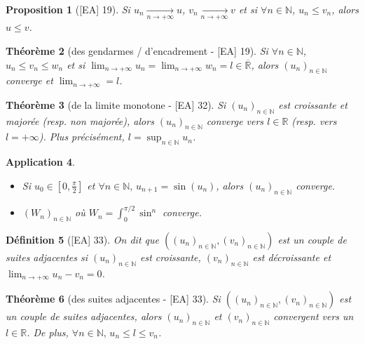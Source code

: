 \documentclass[10pt, a4paper, parskip=full, twoside, twocolumn]{report}
\newtheorem{definition}{Définition}
\newtheorem{theorem}[definition]{Théorème}
\newtheorem{proposition}[definition]{Proposition}
\newtheorem{application}[definition]{Application}
\newcommand{\IN}{\mathbb{N}}
\newcommand{\IR}{\mathbb{R}}
\begin{document}
\begin{proposition}[\textnormal{[EA] 19}]
	Si $u_n\xrightarrow[n\to +\infty]{} u$, $v_n\xrightarrow[n\to +\infty]{} v$ et si $\forall n\in \IN$, $u_n\leq v_n$, alors $u\leq v$.
\end{proposition}

\begin{theorem}[des gendarmes / d'encadrement - \textnormal{[EA] 19}]
	Si $\forall n\in\IN$, $u_n\leq v_n\leq w_n$ et si $\displaystyle{\lim_{n\to +\infty} u_n = \lim_{n\to +\infty} w_n = l \in \overline{\IR}}$, 
	alors $\left(u_n\right)_{n\in\IN}$ converge et $\displaystyle{\lim_{n\to +\infty}} = l$.
\end{theorem}

\begin{theorem}[de la limite monotone - \textnormal{[EA] 32}]
	Si $\left(u_n\right)_{n\in\IN}$ est croissante et majorée (resp. non majorée), alors $\left(u_n\right)_{n\in\IN}$ converge vers $l\in\IR$ (resp. vers $l = +\infty$).
	Plus précisément, $\displaystyle{l = \sup_{n\in\IN} u_n}$.
\end{theorem}

\begin{application}
	\begin{itemize}
		\item Si $u_0\in [0,\frac{\pi}{2}]$ et $\forall n\in \IN,\, u_{n+1}=\sin(u_n)$, alors $\left(u_n\right)_{n\in\IN}$ converge.
		\item $\left(W_n\right)_{n\in\IN}$ où $W_n = \int_{0}^{\pi/2}\sin^n$ converge.
	\end{itemize}
\end{application}

\begin{definition}[\textnormal{[EA] 33}]
	On dit que $\left(\left(u_n\right)_{n\in\IN},\left(v_n\right)_{n\in\IN}\right)$ est un \emph{couple de suites adjacentes} si $\left(u_n\right)_{n\in\IN}$ est croissante, $\left(v_n\right)_{n\in\IN}$ est décroissante et $\displaystyle{\lim_{n\to +\infty} u_n-v_n = 0}$.
\end{definition}

\begin{theorem}[des suites adjacentes - \textnormal{[EA] 33}]
	Si $\left(\left(u_n\right)_{n\in\IN},\left(v_n\right)_{n\in\IN}\right)$ est un couple de suites adjacentes, alors $\left(u_n\right)_{n\in\IN}$ et $\left(v_n\right)_{n\in\IN}$ convergent vers un $l\in\IR$.
	De plus, $\forall n\in\IN,\, u_n\leq l\leq v_n$.
\end{theorem}
\end{document}
